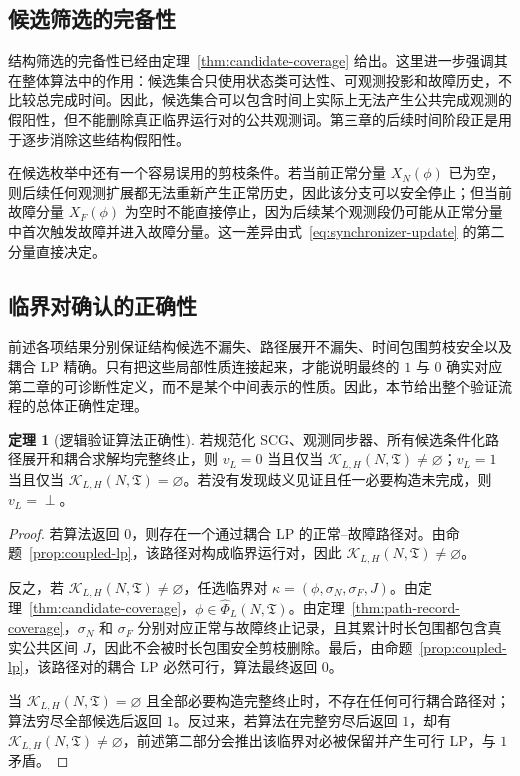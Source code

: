 \documentclass[master,fontset=ubuntu]{shnuthesis}
\DeclareRobustCommand{\logicstatus}[1]{\ensuremath{#1}}
\theoremstyle{definition}
\newtheorem{thesistheorem}{定理}
\begin{document}
\subsection{候选筛选的完备性}

结构筛选的完备性已经由定理~\ref{thm:candidate-coverage} 给出。这里进一步强调其在整体算法中的作用：候选集合只使用状态类可达性、可观测投影和故障历史，不比较总完成时间。因此，候选集合可以包含时间上实际上无法产生公共完成观测的假阳性，但不能删除真正临界运行对的公共观测词。第三章的后续时间阶段正是用于逐步消除这些结构假阳性。

在候选枚举中还有一个容易误用的剪枝条件。若当前正常分量 \(X_N(\phi)\) 已为空，则后续任何观测扩展都无法重新产生正常历史，因此该分支可以安全停止；但当前故障分量 \(X_F(\phi)\) 为空时不能直接停止，因为后续某个观测段仍可能从正常分量中首次触发故障并进入故障分量。这一差异由式~\eqref{eq:synchronizer-update} 的第二分量直接决定。

\subsection{临界对确认的正确性}

前述各项结果分别保证结构候选不漏失、路径展开不漏失、时间包围剪枝安全以及耦合 LP 精确。只有把这些局部性质连接起来，才能说明最终的 \logicstatus{1} 与 \logicstatus{0} 确实对应第二章的可诊断性定义，而不是某个中间表示的性质。因此，本节给出整个验证流程的总体正确性定理。

\begin{thesistheorem}[逻辑验证算法正确性]
\label{thm:logical-verifier-correctness}
若规范化 SCG、观测同步器、所有候选条件化路径展开和耦合求解均完整终止，则 \(v_L=0\) 当且仅当 \(\mathcal K_{L,H}(N,\mathfrak T)\neq\varnothing\)；\(v_L=1\) 当且仅当 \(\mathcal K_{L,H}(N,\mathfrak T)=\varnothing\)。若没有发现歧义见证且任一必要构造未完成，则 \(v_L=\perp\)。
\end{thesistheorem}

\begin{proof}
若算法返回 \logicstatus{0}，则存在一个通过耦合 LP 的正常--故障路径对。由命题~\ref{prop:coupled-lp}，该路径对构成临界运行对，因此 \(\mathcal K_{L,H}(N,\mathfrak T)\neq\varnothing\)。

反之，若 \(\mathcal K_{L,H}(N,\mathfrak T)\neq\varnothing\)，任选临界对 \(\kappa=(\phi,\sigma_N,\sigma_F,J)\)。由定理~\ref{thm:candidate-coverage}，\(\phi\in\widehat\Phi_L(N,\mathfrak T)\)。由定理~\ref{thm:path-record-coverage}，\(\sigma_N\) 和 \(\sigma_F\) 分别对应正常与故障终止记录，且其累计时长包围都包含真实公共区间 \(J\)，因此不会被时长包围安全剪枝删除。最后，由命题~\ref{prop:coupled-lp}，该路径对的耦合 LP 必然可行，算法最终返回 \logicstatus{0}。

当 \(\mathcal K_{L,H}(N,\mathfrak T)=\varnothing\) 且全部必要构造完整终止时，不存在任何可行耦合路径对；算法穷尽全部候选后返回 \logicstatus{1}。反过来，若算法在完整穷尽后返回 \logicstatus{1}，却有 \(\mathcal K_{L,H}(N,\mathfrak T)\neq\varnothing\)，前述第二部分会推出该临界对必被保留并产生可行 LP，与 \logicstatus{1} 矛盾。
\end{proof}
\end{document}

